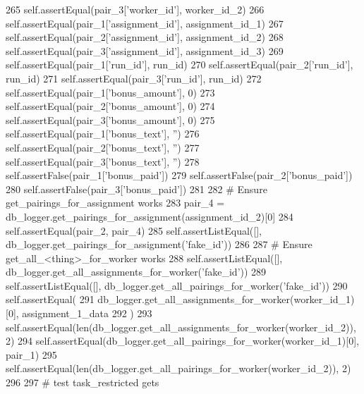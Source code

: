 \begin{DoxyCode}
265         self.assertEqual(pair\_3[\textcolor{stringliteral}{'worker\_id'}], worker\_id\_2)
266         self.assertEqual(pair\_1[\textcolor{stringliteral}{'assignment\_id'}], assignment\_id\_1)
267         self.assertEqual(pair\_2[\textcolor{stringliteral}{'assignment\_id'}], assignment\_id\_2)
268         self.assertEqual(pair\_3[\textcolor{stringliteral}{'assignment\_id'}], assignment\_id\_3)
269         self.assertEqual(pair\_1[\textcolor{stringliteral}{'run\_id'}], run\_id)
270         self.assertEqual(pair\_2[\textcolor{stringliteral}{'run\_id'}], run\_id)
271         self.assertEqual(pair\_3[\textcolor{stringliteral}{'run\_id'}], run\_id)
272         self.assertEqual(pair\_1[\textcolor{stringliteral}{'bonus\_amount'}], 0)
273         self.assertEqual(pair\_2[\textcolor{stringliteral}{'bonus\_amount'}], 0)
274         self.assertEqual(pair\_3[\textcolor{stringliteral}{'bonus\_amount'}], 0)
275         self.assertEqual(pair\_1[\textcolor{stringliteral}{'bonus\_text'}], \textcolor{stringliteral}{''})
276         self.assertEqual(pair\_2[\textcolor{stringliteral}{'bonus\_text'}], \textcolor{stringliteral}{''})
277         self.assertEqual(pair\_3[\textcolor{stringliteral}{'bonus\_text'}], \textcolor{stringliteral}{''})
278         self.assertFalse(pair\_1[\textcolor{stringliteral}{'bonus\_paid'}])
279         self.assertFalse(pair\_2[\textcolor{stringliteral}{'bonus\_paid'}])
280         self.assertFalse(pair\_3[\textcolor{stringliteral}{'bonus\_paid'}])
281 
282         \textcolor{comment}{# Ensure get\_pairings\_for\_assignment works}
283         pair\_4 = db\_logger.get\_pairings\_for\_assignment(assignment\_id\_2)[0]
284         self.assertEqual(pair\_2, pair\_4)
285         self.assertListEqual([], db\_logger.get\_pairings\_for\_assignment(\textcolor{stringliteral}{'fake\_id'}))
286 
287         \textcolor{comment}{# Ensure get\_all\_<thing>\_for\_worker works}
288         self.assertListEqual([], db\_logger.get\_all\_assignments\_for\_worker(\textcolor{stringliteral}{'fake\_id'}))
289         self.assertListEqual([], db\_logger.get\_all\_pairings\_for\_worker(\textcolor{stringliteral}{'fake\_id'}))
290         self.assertEqual(
291             db\_logger.get\_all\_assignments\_for\_worker(worker\_id\_1)[0], assignment\_1\_data
292         )
293         self.assertEqual(len(db\_logger.get\_all\_assignments\_for\_worker(worker\_id\_2)), 2)
294         self.assertEqual(db\_logger.get\_all\_pairings\_for\_worker(worker\_id\_1)[0], pair\_1)
295         self.assertEqual(len(db\_logger.get\_all\_pairings\_for\_worker(worker\_id\_2)), 2)
296 
297         \textcolor{comment}{# test task\_restricted gets}

\end{DoxyCode}

